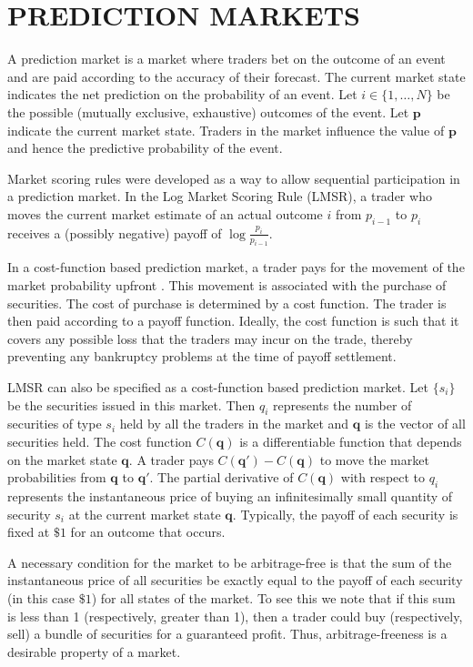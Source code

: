 \documentclass{article}
\newcommand{\pvec}{\mathbf{p}}
\newcommand{\qvec}{\mathbf{q}}
\begin{document}
\section{PREDICTION MARKETS}
A prediction market is a market where traders bet on the outcome of an event and are paid according to the accuracy of their forecast. The current market state indicates the net prediction on the probability of an event. Let $i\in\{1,\ldots,N\}$ be the possible (mutually exclusive, exhaustive) outcomes of the event. Let $\pvec$ indicate the current market state. Traders in the market influence the value of $\pvec$ and hence the predictive probability of the event.

Market scoring rules were developed as a way to allow sequential participation in a prediction market. In the Log Market Scoring Rule (LMSR), a trader who moves the current market estimate of an actual outcome $i$ from $p_{i-1}$ to $p_i$ receives a (possibly negative) payoff of $\log\frac{p_i}{p_{i-1}}$.

In a cost-function based prediction market, a trader pays for the movement of the market probability upfront \cite{hanson03}. This movement is associated with the purchase of securities. The cost of purchase is determined by a cost function. The trader is then paid according to a payoff function. %
Ideally, the cost function is such that it covers any possible loss that the traders may incur on the trade, thereby preventing any bankruptcy problems at the time of payoff settlement.

LMSR can also be specified as a cost-function based prediction market. Let $\{s_{i}\}$ be the securities issued in this market. Then $q_{i}$ represents the number of securities of type $s_{i}$ held by all the traders in the market and $\qvec$ is the vector of all securities held. The cost function $C(\qvec)$ is a differentiable function that depends on the market state $\qvec$. A trader pays $C(\qvec')-C(\qvec)$ to move the market probabilities from $\qvec$ to $\qvec'$. The partial derivative of $C(\qvec)$ with respect to $q_{i}$ represents the instantaneous price of buying an infinitesimally small quantity of security $s_{i}$ at the current market state $\qvec$. Typically, the payoff of each security is fixed at $\$1$ for an outcome  that occurs. 

A necessary condition for the market to be arbitrage-free is that the sum of the instantaneous price of all securities be exactly equal to the payoff of each security (in this case $\$1$) for all states of the market. To see this we note that if this sum is less than 1 (respectively, greater than 1), then a trader could buy (respectively, sell) a bundle of securities for a guaranteed profit. Thus, arbitrage-freeness is a desirable property of a market. 
\end{document}
